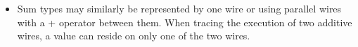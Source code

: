 \documentclass{llncs}
\begin{document}
\begin{itemize}
\item Sum types may similarly be represented by one wire or using
  parallel wires with a {{+}} operator between them. When tracing the
  execution of two additive wires, a value can reside on only one of the two
  wires.
\begin{multicols}{4}
\begin{center}
\end{center}
\begin{center}
\end{center}
\begin{center}
\end{center}
\begin{center}
\end{center}
\end{multicols}





\end{itemize}
\end{document}
